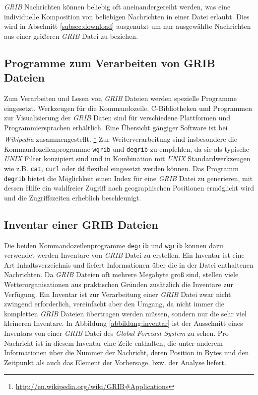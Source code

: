 \textit{GRIB} Nachrichten können beliebig oft aneinandergereiht
werden, was eine individuelle Komposition von beliebigen Nachrichten
in einer Datei erlaubt. Dies wird in Abschnitt \ref{subsec:download}
ausgenutzt um nur ausgewählte Nachrichten aus einer größeren
\textit{GRIB} Datei zu beziehen.

\subsection{Programme zum Verarbeiten von GRIB Dateien}

Zum Verarbeiten und Lesen von \textit{GRIB} Dateien werden spezielle
Programme eingesetzt. Werkzeugen für die Kommandozeile, C-Bibliotheken
und Programmen zur Visualisierung der \textit{GRIB} Daten sind für
verschiedene Plattformen und Programmiersprachen erhältlich. Eine
Übersicht gängiger Software ist bei \textit{Wikipedia}
zusammengestellt.
\footnote{\url{http://en.wikipedia.org/wiki/GRIB\#Applications}} Zur
Weiterverarbeitung sind insbesondere die Kommandozeilenprogramme
\texttt{wgrib} und \texttt{degrib} zu empfehlen, da sie als typische
\textit{UNIX} Filter konzipiert sind und in Kombination mit
\textit{UNIX} Standardwerkzeugen wie z.B. \texttt{cat}, \texttt{curl}
oder \texttt{dd} flexibel eingesetzt werden können. Das Programm
\texttt{degrib} bietet die Möglichkeit einen Index für eine
\textit{GRIB} Datei zu generieren, mit dessen Hilfe ein wahlfreier
Zugriff nach geographischen Positionen ermöglicht wird und die
Zugriffszeiten erheblich beschleunigt.

\subsection{Inventar einer GRIB Dateien}

Die beiden Kommandozeilenprogramme \texttt{degrib} und \texttt{wgrib}
können dazu verwendet werden Inventare von \textit{GRIB} Datei zu
erstellen. Ein Inventar ist eine Art Inhaltsverzeichnis und liefert
Informationen über die in der Datei enthaltenen Nachrichten. Da
\textit{GRIB} Dateien oft mehrere Megabyte groß sind, stellen viele
Wetterorganisationen aus praktischen Gründen zusätzlich die Inventare
zur Verfügung. Ein Inventar ist zur Verarbeitung einer \textit{GRIB}
Datei zwar nicht zwingend erforderlich, vereinfacht aber den Umgang,
da nicht immer die kompletten \textit{GRIB} Dateien übertragen werden
müssen, sondern nur die sehr viel kleineren Inventare. In Abbildung
\ref{abbildung:inventar} ist der Ausschnitt eines Inventars von einer
\textit{GRIB} Datei des \textit{Global Forecast System} zu sehen. Pro
Nachricht ist in diesem Inventar eine Zeile enthalten, die unter
anderem Informationen über die Nummer der Nachricht, deren Position in
Bytes und den Zeitpunkt als auch das Element der Vorhersage, bzw. der
Analyse liefert.

